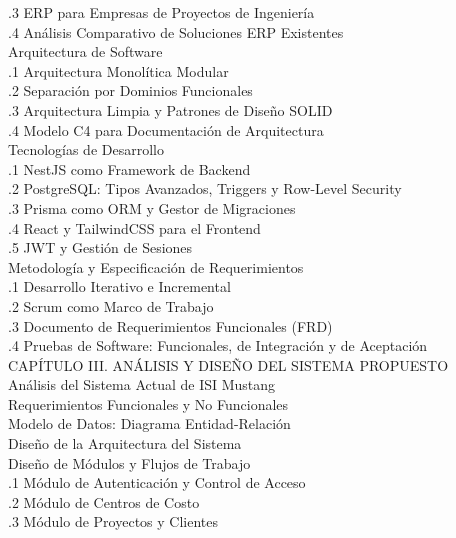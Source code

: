 \documentclass{univalle-perfil}
\begin{document}
\begin{indicetentativo}
\quad{}.3 ERP para Empresas de Proyectos de Ingeniería \\
\quad{}.4 Análisis Comparativo de Soluciones ERP Existentes \\
 Arquitectura de Software \\
\quad{}.1 Arquitectura Monolítica Modular \\
\quad{}.2 Separación por Dominios Funcionales \\
\quad{}.3 Arquitectura Limpia y Patrones de Diseño SOLID \\
\quad{}.4 Modelo C4 para Documentación de Arquitectura \\
 Tecnologías de Desarrollo \\
\quad{}.1 NestJS como Framework de Backend \\
\quad{}.2 PostgreSQL: Tipos Avanzados, Triggers y Row-Level Security \\
\quad{}.3 Prisma como ORM y Gestor de Migraciones \\
\quad{}.4 React y TailwindCSS para el Frontend \\
\quad{}.5 JWT y Gestión de Sesiones \\
 Metodología y Especificación de Requerimientos \\
\quad{}.1 Desarrollo Iterativo e Incremental \\
\quad{}.2 Scrum como Marco de Trabajo \\
\quad{}.3 Documento de Requerimientos Funcionales (FRD) \\
\quad{}.4 Pruebas de Software: Funcionales, de Integración y de Aceptación \\[2pt]
CAPÍTULO III. ANÁLISIS Y DISEÑO DEL SISTEMA PROPUESTO \\
 Análisis del Sistema Actual de ISI Mustang \\
 Requerimientos Funcionales y No Funcionales \\
 Modelo de Datos: Diagrama Entidad-Relación \\
 Diseño de la Arquitectura del Sistema \\
 Diseño de Módulos y Flujos de Trabajo \\
\quad{}.1 Módulo de Autenticación y Control de Acceso \\
\quad{}.2 Módulo de Centros de Costo \\
\quad{}.3 Módulo de Proyectos y Clientes \\

\end{indicetentativo}
\end{document}
